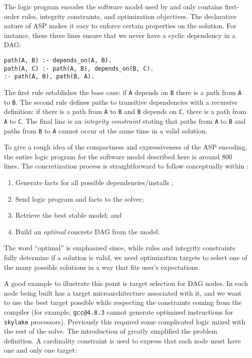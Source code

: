 The logic program encodes the software model used by \spack{} and only contains
first-order rules, integrity constraints, and optimization objectives. The declarative
nature of ASP makes it easy to enforce certain properties on the solution. For
instance, these three lines ensure that we never have a cyclic dependency in a DAG:

\begin{verbatim}
path(A, B) :- depends_on(A, B).
path(A, C) :- path(A, B), depends_on(B, C).
:- path(A, B), path(B, A).
\end{verbatim}

The first rule establishes the base case: if \texttt{A} depends
on \texttt{B} there is a path from \texttt{A} to \texttt{B}.
The second rule defines paths to transitive dependencies
with a recursive definition: if there is a path from \texttt{A}
to \texttt{B} and \texttt{B} depends on \texttt{C}, there is
a path from \texttt{A} to \texttt{C}. The final line is an
\emph{integrity constraint} stating that paths from \texttt{A}
to \texttt{B} and paths from \texttt{B} to \texttt{A} cannot
occur at the same time in a valid solution.

To give a rough idea of the compactness and expressiveness of the ASP encoding, the
entire logic program for the software model described here is around $800$ lines. The
concretization process is straightforward to follow conceptually within \spack:
\begin{enumerate}
\item Generate facts for all possible dependencies/installs \footnotemark;
\item Send logic program and facts to the solver;
\item Retrieve the best stable model; and
\item Build an {\it optimal} concrete DAG from the model.
\end{enumerate}
The word ``optimal'' is emphasized since, while rules and integrity
constraints fully determine if a solution is valid, we need
optimization targets to select one of the many possible solutions
in a way that fits user's expectations.

A good example to illustrate this point is target selection for DAG nodes. In \spack{}
each node being built has a target microarchitecture associated with it, and we want to
use the best target possible while respecting the constraints coming from the compiler
(for example, {\tt gcc@4.8.3} cannot generate optimized instructions for {\tt skylake}
processors). Previously this required some complicated logic mixed with the rest of the
solve. The introduction of \clingo{} greatly simplified the problem definition. A
cardinality constraint is used to express that each node must have one and only one
target:

